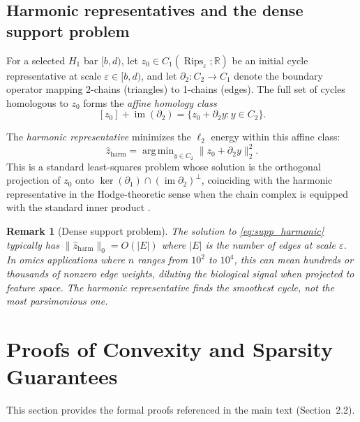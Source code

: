 \documentclass[11pt]{article}
\newtheorem{remark}[theorem]{Remark}
\DeclareMathOperator{\Rips}{Rips}
\DeclareMathOperator*{\argmin}{arg\,min}
\begin{document}
\subsection{Harmonic representatives and the dense support problem}

For a selected $H_1$ bar $[b, d)$, let $z_0 \in C_1(\Rips_\varepsilon; \mathbb{R})$ be an initial cycle representative at scale $\varepsilon \in [b, d)$, and let $\partial_2 : C_2 \to C_1$ denote the boundary operator mapping 2-chains (triangles) to 1-chains (edges).
The full set of cycles homologous to $z_0$ forms the \emph{affine homology class}
\begin{equation}\label{eq:supp_affine}
[z_0] + \operatorname{im}(\partial_2) = \{z_0 + \partial_2 y : y \in C_2\}.
\end{equation}

The \emph{harmonic representative} minimizes the $\ell_2$ energy within this affine class:
\begin{equation}\label{eq:supp_harmonic}
\hat{z}_{\mathrm{harm}} = \argmin_{y \in C_2} \| z_0 + \partial_2 y \|_2^2.
\end{equation}
This is a standard least-squares problem whose solution is the orthogonal projection of $z_0$ onto $\ker(\partial_1) \cap (\operatorname{im} \partial_2)^\perp$, coinciding with the harmonic representative in the Hodge-theoretic sense when the chain complex is equipped with the standard inner product \cite{harmonicPH, friedman1998}.

\begin{remark}[Dense support problem]\label{rem:supp_dense}
The solution to \eqref{eq:supp_harmonic} typically has $\|\hat{z}_{\mathrm{harm}}\|_0 = O(|E|)$ where $|E|$ is the number of edges at scale $\varepsilon$.
In omics applications where $n$ ranges from $10^2$ to $10^4$, this can mean hundreds or thousands of nonzero edge weights, diluting the biological signal when projected to feature space.
The harmonic representative finds the smoothest cycle, not the most parsimonious one.
\end{remark}


\section{Proofs of Convexity and Sparsity Guarantees}
\label{sec:supp_proofs}

This section provides the formal proofs referenced in the main text (Section~2.2).
\end{document}
